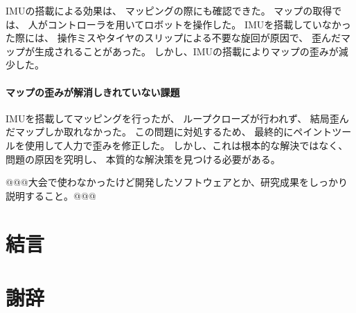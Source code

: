 \documentclass[twocolumn,9pt]{jsproceedings}
\begin{document}
IMUの搭載による効果は、
マッピングの際にも確認できた。
マップの取得では、
人がコントローラを用いてロボットを操作した。
IMUを搭載していなかった際には、
操作ミスやタイヤのスリップによる不要な旋回が原因で、
歪んだマップが生成されることがあった。
しかし、IMUの搭載によりマップの歪みが減少した。


\paragraph{マップの歪みが解消しきれていない課題}


IMUを搭載してマッピングを行ったが、
ループクローズが行われず、
結局歪んだマップしか取れなかった。
この問題に対処するため、
最終的にペイントツールを使用して人力で歪みを修正した。
しかし、これは根本的な解決ではなく、
問題の原因を究明し、
本質的な解決策を見つける必要がある。


@@@大会で使わなかったけど開発したソフトウェアとか、研究成果をしっかり説明すること。@@@

\section{結言}
\section*{謝辞}

\end{document}
